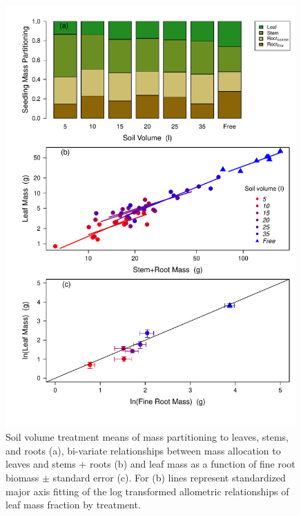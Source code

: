 \documentclass[a4paper]{article}\usepackage[]{graphicx}\usepackage[]{color}
\begin{document}
\begin{figure}[h!]
    \centering
    \includegraphics[width=0.99\textwidth]{massfractions.pdf}
    \caption{Soil volume treatment means of mass partitioning to leaves, stems, and roots (a), bi-variate relationships between mass allocation to leaves and stems + roots (b) and leaf mass as a function of fine root biomass $\pm$ standard error (c). For (b) lines represent standardized major axis fitting of the log transformed allometric relationships of leaf mass fraction by treatment.}
    \label{fig:figure3}
\end{figure}
\end{document}
